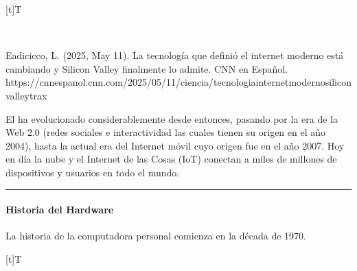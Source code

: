 \documentclass[letterpaper,10pt,spanish]{sphinxmanual}
\let\sphinxpxdimen\pdfpxdimen\else\newdimen\sphinxpxdimen
\begin{document}
\begin{savenotes}\sphinxattablestart
\sphinxthistablewithglobalstyle
\centering
\begin{tabulary}{\linewidth}[t]{T}
\sphinxtoprule
\sphinxtableatstartofbodyhook

\begin{sphinxfigure-in-table}
\centering
\capstart
\noindent\sphinxincludegraphics[width=700\sphinxpxdimen]{{image03}.png}
\label{\detokenize{cursos/informatica10/recursos/T01:id28}}\end{sphinxfigure-in-table}\relax
\\
\sphinxbottomrule
\end{tabulary}
\sphinxtableafterendhook\par
\sphinxattableend\end{savenotes}

\sphinxAtStartPar
%
\begin{footnote}[4]\sphinxAtStartFootnote
Eadicicco, L. (2025, May 11). La tecnologí­a que definió el internet moderno está cambiando y Silicon Valley finalmente lo admite. CNN en Español. https://cnnespanol.cnn.com/2025/05/11/ciencia/tecnologia\sphinxhyphen{}internet\sphinxhyphen{}moderno\sphinxhyphen{}silicon\sphinxhyphen{}valley\sphinxhyphen{}trax
%
\end{footnote} El  ha evolucionado considerablemente desde entonces, pasando por la era de la Web 2.0 (redes sociales e interactividad las cuales tienen su origen en el año 2004), hasta la actual era del Internet móvil cuyo origen fue en el año 2007.  Hoy en día la nube y el Internet de las Cosas (IoT) conectan a miles de millones de dispositivos y usuarios en todo el mundo.


\bigskip\hrule\bigskip



\paragraph{Historia del Hardware}
\label{\detokenize{cursos/informatica10/recursos/T01:historia-del-hardware}}
\sphinxAtStartPar
La historia de la computadora personal comienza en la década de 1970.


\begin{savenotes}\sphinxattablestart
\sphinxthistablewithglobalstyle
\centering
\begin{tabulary}{\linewidth}[t]{T}
\sphinxtoprule
\sphinxtableatstartofbodyhook

\begin{sphinxfigure-in-table}
\centering
\capstart
\noindent\sphinxincludegraphics[width=300\sphinxpxdimen]{{image04}.png}
\label{\detokenize{cursos/informatica10/recursos/T01:id29}}\end{sphinxfigure-in-table}\relax
\\
\sphinxbottomrule
\end{tabulary}
\sphinxtableafterendhook\par
\sphinxattableend\end{savenotes}
\end{document}
